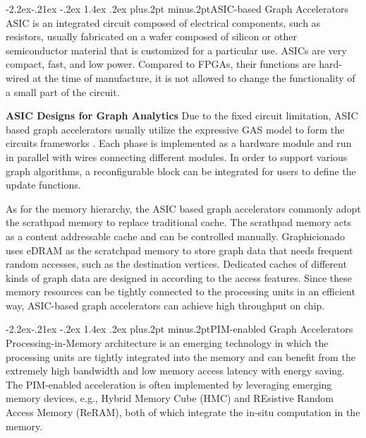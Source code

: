 \documentclass[twoside]{article}
\makeatletter
\def\subsubsection{\@startsection{subsubsection}{3}{\z@}%
 {-2.2ex\@plus -.21ex \@minus -.2ex}%
 {1.4ex \@plus.2ex}
{\normalfont\normalsize\protect\baselineskip=12pt plus.2pt minus.2pt\sl}}
\makeatother
\begin{document}
\begin{multicols}{2}
\subsubsection{ASIC-based Graph Accelerators}
ASIC is an integrated circuit composed of electrical components, such as resistors, usually fabricated on a wafer composed of silicon or other semiconductor material that is customized for a particular use. ASICs are very compact, fast, and low power. Compared to FPGAs, their functions are hard-wired at the time of manufacture, it is not allowed to change the functionality of a small part of the circuit. 

{\bf ASIC Designs for Graph Analytics}\quad 
Due to the fixed circuit limitation, ASIC based graph accelerators usually utilize the expressive GAS model to form the circuits frameworks \cite{zhou2017tunao,ozdal2016energy}. Each phase is implemented as a hardware module and run in parallel with wires connecting different modules. In order to support various graph algorithms, a reconfigurable block can be integrated for users to define the update functions. 

As for the memory hierarchy, the ASIC based graph accelerators commonly adopt the scrathpad memory to replace traditional cache. The scrathpad memory acts as a content addressable cache and can be controlled manually. Graphicionado \cite{ham2016graphicionado} uses eDRAM as the scratchpad memory to store graph data that needs frequent random accesses, such as the destination vertices. Dedicated caches of different kinds of graph data are designed in \cite{ozdal2016energy} according to the access features. Since these memory resources can be tightly connected to the processing units in an efficient way, ASIC-based graph accelerators can achieve high throughput on chip. 

\subsubsection{PIM-enabled Graph Accelerators}
Processing-in-Memory architecture is an emerging technology in which the processing units are tightly integrated into the memory and can benefit from the extremely high bandwidth and low memory access latency with energy saving. The PIM-enabled acceleration is often implemented by leveraging emerging memory devices, e.g., Hybrid Memory Cube (HMC) and REsistive Random Access Memory (ReRAM), both of which integrate the in-situ computation in the memory.


\end{multicols}
\end{document}
